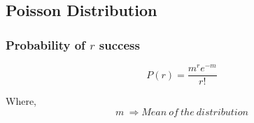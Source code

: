 \subsection{Poisson Distribution}

\subsubsection{Probability of $r$ success}
\[P(r) = \frac{m^r e^{-m}}{r!}\]

Where, \\
\[m\ \Rightarrow Mean\ of\ the\ distribution\]


